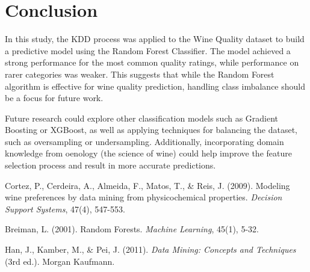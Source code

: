 \documentclass{article}
\begin{document}
\section{Conclusion}
In this study, the KDD process was applied to the Wine Quality dataset to build a predictive model using the Random Forest Classifier. The model achieved a strong performance for the most common quality ratings, while performance on rarer categories was weaker. This suggests that while the Random Forest algorithm is effective for wine quality prediction, handling class imbalance should be a focus for future work.

Future research could explore other classification models such as Gradient Boosting or XGBoost, as well as applying techniques for balancing the dataset, such as oversampling or undersampling. Additionally, incorporating domain knowledge from oenology (the science of wine) could help improve the feature selection process and result in more accurate predictions.

\begin{thebibliography}{9}
Cortez, P., Cerdeira, A., Almeida, F., Matos, T., \& Reis, J. (2009). Modeling wine preferences by data mining from physicochemical properties. \textit{Decision Support Systems}, 47(4), 547-553.

Breiman, L. (2001). Random Forests. \textit{Machine Learning}, 45(1), 5-32.

Han, J., Kamber, M., \& Pei, J. (2011). \textit{Data Mining: Concepts and Techniques} (3rd ed.). Morgan Kaufmann.
\end{thebibliography}
\end{document}

